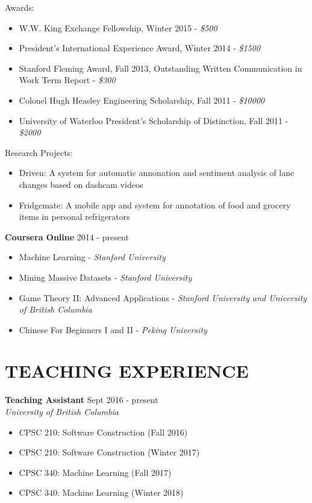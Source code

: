 \documentclass[10pt]{res} %
\begin{document}
\begin{resume}
Awards:
\begin{itemize} 
    \item W.W. King Exchange Fellowship, Winter 2015 - {\sl\$500}
    \item President's International Experience Award, Winter 2014 - {\sl\$1500}
    \item Stanford Fleming Award, Fall 2013, Outstanding Written Communication in Work Term Report - {\sl\$300}
    \item Colonel Hugh Heasley Engineering Scholarship, Fall 2011 - {\sl\$10000}
    \item University of Waterloo President's Scholarship of Distinction, Fall 2011 - {\sl\$2000}
\end{itemize}

Research Projects:
\begin{itemize}   
    \item Driven: A system for automatic annonation and sentiment
    analysis of lane changes based on dashcam videos
    \item Fridgemate: A mobile app and system for annotation of food
    and grocery items in personal refrigerators
\end{itemize}

\textbf {Coursera Online} \hfill 2014 - present \\
\begin{itemize} 
    \item Machine Learning - {\sl Stanford University}
    \item Mining Massive Datasets - {\sl Stanford University}
    \item Game Theory II: Advanced Applications - {\sl Stanford University and University of British Columbia}
    \item Chinese For Beginners I and II - {\sl Peking University}
\end{itemize}


\section{TEACHING EXPERIENCE}

\vspace{0.2in} %

\textbf{Teaching Assistant} \hfill Sept 2016 - present \\
{\sl University of British Columbia }
\begin{itemize}
    \item CPSC 210: Software Construction (Fall 2016)
    \item CPSC 210: Software Construction (Winter 2017)
    \item CPSC 340: Machine Learning (Fall 2017)
    \item CPSC 340: Machine Learning (Winter 2018)
\end{itemize}


\end{resume}
\end{document}
